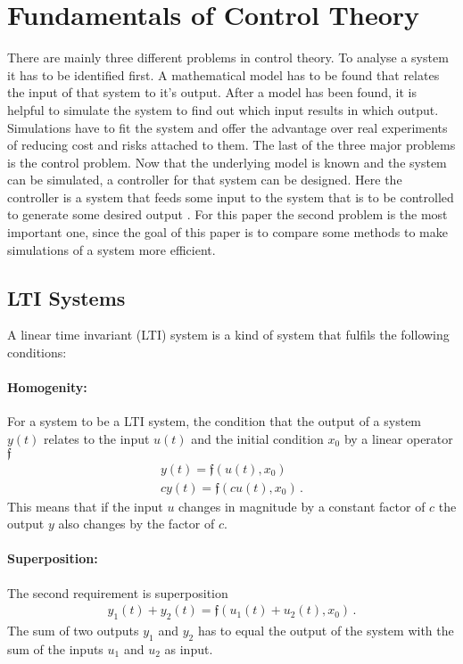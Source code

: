 \section{Fundamentals of Control Theory}
There are mainly three different problems in control theory.
To analyse a system it has to be identified first.
A mathematical model has to be found that relates the input of that system to it's output.
After a model has been found, it is helpful to simulate the system to find out which input results in which output.
Simulations have to fit the system and offer the advantage over real experiments of reducing cost and risks attached to them.
The last of the three major problems is the control problem.
Now that the underlying model is known and the system can be simulated, a controller for that system can be designed.
Here the controller is a system that feeds some input to the system that is to be controlled to generate some desired output \cite{DouglasBa}.
For this paper the second problem is the most important one, since the goal of this paper is to compare some methods to make simulations of a system more efficient.
\subsection{LTI Systems}
A linear time invariant (LTI) system is a kind of system that fulfils the following conditions:
\paragraph{Homogenity:}
For a system to be a LTI system, the condition that the output of a system \(y(t)\) relates to the input \(u(t)\) and the initial condition \(x_0\) by a linear operator \(\mathfrak{f}\)
\begin{gather}
y(t) = \mathfrak{f}(u(t), x_0) \\
cy(t) = \mathfrak{f}(cu(t),  x_0) \,.
\end{gather}
This means that if the input \(u\) changes in magnitude by a constant factor of \(c\) the output \(y\) also changes by the factor of \(c\).
\paragraph{Superposition:}
The second requirement is superposition
\begin{gather}
y_1(t) + y_2(t) = \mathfrak{f}(u_1(t) + u_2(t), x_0) \,.
\end{gather}
The sum of two outputs \(y_1\) and \(y_2\) has to equal the output of the system with the sum of the inputs \(u_1\) and \(u_2\) as input.
